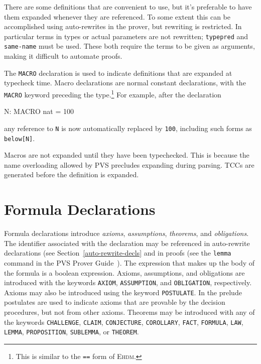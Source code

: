 There are some definitions that are convenient to use, but it's preferable
to have them expanded whenever they are referenced.  To some extent this
can be accomplished using auto-rewrites in the prover, but rewriting is
restricted.  In particular terms in types or actual parameters are not
rewritten; \texttt{typepred} and \texttt{same-name} must be used.  These
both require the terms to be given as arguments, making it difficult to
automate proofs.

The \texttt{MACRO} declaration is used to indicate definitions that are
expanded at typecheck time.  Macro declarations are normal constant
declarations, with the \texttt{MACRO} keyword preceding the
type.\footnote{This is similar to the \texttt{==} form of E\textsc{hdm}.}
For example, after the declaration
\begin{pvsex}
  N: MACRO nat = 100
\end{pvsex}
any reference to \texttt{N} is now automatically replaced by \texttt{100},
including such forms as \texttt{below[N]}.

Macros are not expanded until they have been typechecked.  This is because
the name overloading allowed by PVS precludes expanding during parsing.
TCCs are generated before the definition is expanded.



\section{Formula Declarations}\label{formula-declarations}

Formula declarations introduce \emph{axioms},
\emph{assumptions}, \emph{theorems},
and \emph{obligations}.  The identifier associated with
the declaration may be referenced in auto-rewrite declarations (see
Section~\ref{auto-rewrite-decls} and in proofs (see the \texttt{lemma} command
in the PVS Prover Guide~\cite{PVS:prover}).  The expression that makes up
the body of the formula is a boolean expression.  Axioms, assumptions, and
obligations are introduced with the keywords \texttt{AXIOM},
\texttt{ASSUMPTION}, and \texttt{OBLIGATION}, respectively.  Axioms may
also be introduced using the keyword \texttt{POSTULATE}.
In the prelude postulates are used to indicate axioms that are provable by
the decision procedures, but not from other axioms.  Theorems may be
introduced with any of the keywords
\texttt{CHALLENGE},
\texttt{CLAIM},
\texttt{CONJECTURE},
\texttt{COROLLARY},
\texttt{FACT},
\texttt{FORMULA},
\texttt{LAW},
\texttt{LEMMA},
\texttt{PROPOSITION},
\texttt{SUBLEMMA}, or
\texttt{THEOREM}.


